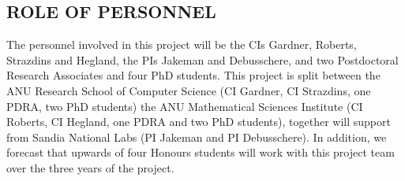 
\subsection*{ROLE OF PERSONNEL}

%

The personnel involved in this project will be the CIs Gardner,
Roberts, Strazdins and Hegland, the PIs Jakeman and Debusschere, and
two Postdoctoral Research Associates and four PhD students.  This
project is split between the ANU Research School of Computer Science
(CI Gardner, CI Strazdins, one PDRA, two PhD students) the ANU
Mathematical Sciences Institute (CI Roberts, CI Hegland, one PDRA and
two PhD students), together will support from Sandia National Labs (PI
Jakeman and PI Debusschere).  In addition, we forecast that upwards of
four Honours students will work with this project team over the three
years of the project.

